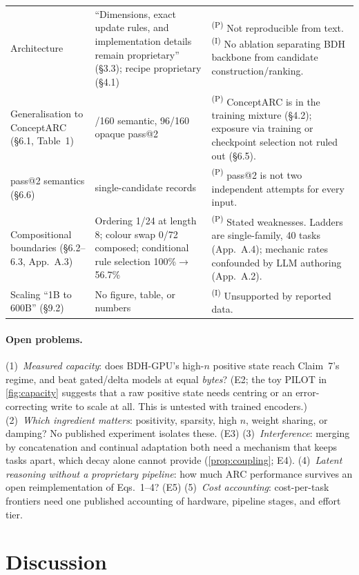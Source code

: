 \documentclass[10pt]{article}
\theoremstyle{remark}
\newcommand{\PS}{\textsuperscript{(P)}}
\newcommand{\IN}{\textsuperscript{(I)}}
\begin{document}
\begin{table}[t]
\begin{tabularx}{\linewidth}{@{}>{\raggedright\arraybackslash}p{3.3cm}>{\raggedright\arraybackslash}X>{\raggedright\arraybackslash}X@{}}
Architecture & ``Dimensions, exact update rules, and implementation details remain proprietary'' (\S3.3); recipe proprietary (\S4.1) &
\PS{} Not reproducible from text. \IN{} No ablation separating BDH backbone from candidate construction/ranking.\\
Generalisation to ConceptARC (\S6.1, Table~1) & 95/160 semantic, 96/160 opaque pass@2 &
\PS{} ConceptARC is in the training mixture (\S4.2); exposure via training or checkpoint selection not ruled out (\S6.5).\\
pass@2 semantics (\S6.6) & 75 single-candidate records & \PS{} pass@2 is not two independent attempts for every input.\\
Compositional boundaries (\S6.2--6.3, App.~A.3) & Ordering 1/24 at length 8; colour swap 0/72 composed; conditional rule selection 100\%$\to$56.7\% &
\PS{} Stated weaknesses. Ladders are single-family, 40 tasks (App.~A.4); mechanic rates confounded by LLM authoring (App.~A.2).\\
Scaling ``1B to 600B'' (\S9.2) & No figure, table, or numbers & \IN{} Unsupported by reported data.\\
\bottomrule
\end{tabularx}
\end{table}

\paragraph{Open problems.} (1)~\emph{Measured capacity}: does BDH-GPU's high-$n$ positive state reach Claim~7's regime,
and beat gated/delta models at equal \emph{bytes}? (E2; the toy PILOT in \cref{fig:capacity} suggests that a raw positive
state needs centring or an error-correcting write to scale at all. This is untested with trained encoders.) (2)~\emph{Which ingredient matters}: positivity, sparsity,
high $n$, weight sharing, or damping? No published experiment isolates these. (E3) (3)~\emph{Interference}: merging by
concatenation and continual adaptation both need a mechanism that keeps tasks apart, which decay alone cannot provide
(\cref{prop:coupling}; E4). (4)~\emph{Latent reasoning without a proprietary pipeline}: how much ARC performance survives
an open reimplementation of Eqs.~1--4? (E5) (5)~\emph{Cost accounting}: cost-per-task frontiers need one published
accounting of hardware, pipeline stages, and effort tier.

\section{Discussion}
\label{sec:discussion}
\end{document}
